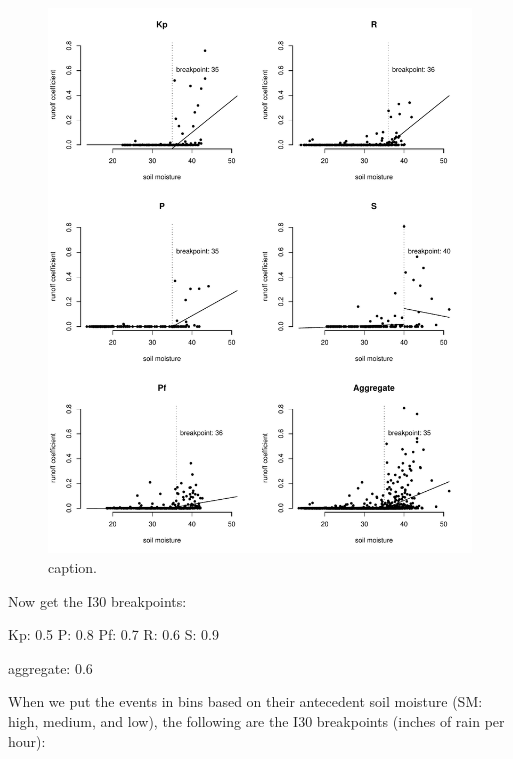 \documentclass[12pt]{article}
\begin{document}
\begin{figure}
    \begin{center}
\includegraphics{runoff-sm}
    \end{center}
    \caption{caption.\label{sm}}
\end{figure}


\vspace{10mm}
Now get the I30 breakpoints:

\begin{Schunk}
\begin{Soutput}
Kp: 0.5
P: 0.8
Pf: 0.7
R: 0.6
S: 0.9
\end{Soutput}
\begin{Soutput}
aggregate: 0.6
\end{Soutput}
\end{Schunk}


\vspace{10mm}
When we put the events in bins based on their antecedent soil moisture (SM: high, medium, and low), the following are the I30 breakpoints (inches of rain per hour):
\end{document}
